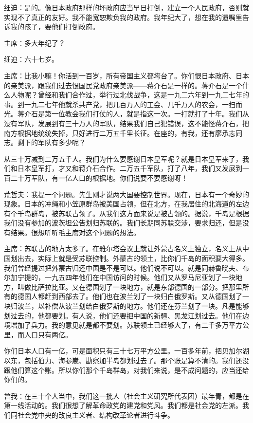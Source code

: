 细迫：是的。像日本政府那样的坏政府应当早日打倒，建立一个人民政府，否则就实现不了真正的友好。我不能宽恕欺负我的政府。我年纪大了，想在我的遗嘱里告诉我的孩子，要他们打倒政府。

主席：多大年纪了？

细迫：六十七岁。

主席：比我小嘛！你活到一百岁，所有帝国主义都垮台了。你们恨日本政府、日本的亲美派，跟我们过去恨国民党政府亲美派——蒋介石是一样的。蒋介石是一个什么人物呢？曾经和我们合作过，举行过北伐战争，这是一九二六年到一九二七年的事。到一九二七年他就杀共产党，把几百万人的工会、几千万人的农会，一扫而光。蒋介石是第一位教会我们打仗的人，就是指这一次。一打就打了十年。我们从没有军队，发展到有三十万人的军队，结果我们自己犯错误，这不能怪蒋介石，把南方根据地统统失掉，只好进行二万五千里长征。在座的，有我，还有廖承志同志。剩下的军队有多少呢？

从三十万减到二万五千人。我们为什么要感谢日本皇军呢？就是日本皇军来了，我们和日本皇军打，才又和蒋介石合作。二万五千军队，打了八年，我们又发展到一百二十万军队，有一亿人口的根据地。你们说要不要感谢呀！

荒哲夫：我提一个问题。先生刚才说两大国要控制世界。现在，日本有一个奇妙的现象。日本的冲绳和小笠原群岛被美国占领，但在北方，在我居住的北海道的左边有个千岛群岛，被苏联占领了。从我们这方面来说是被占领的。据说，千岛是根据我们没有参加的波茨坦公告划归苏联的。我们长期同苏联交涉，要求归还，但是没有结果。很想听听毛主席对这个问题的想法。

主席：苏联占的地方太多了。在雅尔塔会议上就让外蒙古名义上独立，名义上从中国划出去，实际上就是受苏联控制。外蒙古的领土，比你们千岛的面积要大得多。我们曾经提过把外蒙古归还中国是不是可以。他们说不可以。就是同赫鲁晓夫、布尔加宁提的，一九五四年他们在中国访问的时候。他们又从罗马尼亚划了一块地方，叫做比萨拉比亚。又在德国划了一块地方，就是东部德国的一部分。把那里所有的德国人都赶到西部去了。他们也在波兰划了一块归白俄罗斯。又从德国划了一块归波兰，以补偿从波兰划给白俄罗斯的地方。他们还在芬兰划了一块。凡是能够划过去的，他都要划。有人说，他们还要把中国的新疆、黑龙江划过去。他们在边境增加了兵力。我的意见就是都不要划。苏联领土已经够大了，有二千多万平方公里，而人口只有两亿。

你们日本人口有一亿，可是面积只有三十七万平方公里。一百多年前，把贝加尔湖以东，包括伯力、海参崴、勘察加半岛都划过去了。那个账是算不清的。我们还没跟他们算这个账。所以你们那个千岛群岛，对我们来说，是不成问题的，应当还给你们的。

曾我：在三十个人当中，我们这一批人（社会主义研究所代表团）最年青，都是在第一线活动的。我们很想了解革命政党的建党和党风。我们都是社会党的左派。我们同社会党中央的改良主义者、结构改革论者进行斗争。

